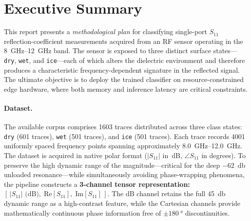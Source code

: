 
\section*{Executive Summary}

This report presents a \emph{methodological plan} for classifying
single-port $S_{11}$ reflection-coefficient measurements acquired from an
RF sensor operating in the \SIrange{8}{12}{\giga\hertz} band.  The sensor
is exposed to three distinct surface states—\texttt{dry},
\texttt{wet}, and \texttt{ice}—each of which alters the dielectric
environment and therefore produces a characteristic frequency-dependent
signature in the reflected signal.  The ultimate objective is to deploy
the trained classifier on resource-constrained edge hardware, where both
memory and inference latency are critical constraints.

\paragraph{Dataset.}
The available corpus comprises \num{1603} traces distributed across three
class states: \texttt{dry} (\num{601} traces), \texttt{wet} (\num{501} traces),
and \texttt{ice} (\num{501} traces). Each trace records \num{4001} uniformly spaced
frequency points spanning approximately \SIrange{8.0}{12.0}{\giga\hertz}.
The dataset is acquired in native polar format ($|S_{11}|$ in~dB,
$\angle S_{11}$ in degrees).  To preserve the high dynamic range of the
magnitude---critical for the deep \SI{-62}{\decibel} unloaded
resonance---while simultaneously avoiding phase-wrapping phenomena, the
pipeline constructs a \textbf{3-channel tensor representation:}
$[\,|S_{11}|\text{ (dB)},\;\text{Re}[S_{11}],\;\text{Im}[S_{11}]\,]$.
The dB channel retains the full \SI{45}{\decibel} dynamic range as a
high-contrast feature, while the Cartesian channels provide
mathematically continuous phase information free of
$\pm\SI{180}{\degree}$ discontinuities.

